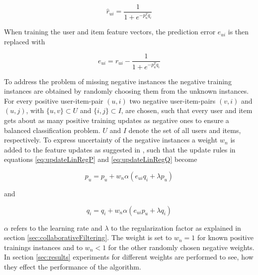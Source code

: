 \documentclass[10pt]{reportMaster}
\begin{document}
$$
	\hat{r}_{ui} = \frac{1}{1 + e^{-p_u^Tq_i}}
$$

When training the user and item feature vectors, the prediction error $e_{ui}$ is then replaced with 

$$
	e_{ui} = r_{ui} - \frac{1}{1 + e^{-p_u^Tq_i}}
$$


To address the problem of missing negative instances the negative training instances are obtained by randomly choosing them from the unknown instances.
For every positive user-item-pair $(u, i)$ two negative user-item-pairs $(v, i)$ and $(u,j)$, with $\{u, v\} \subset U$ and $\{i, j\} \subset I$, are chosen, such that every user and item gets about as many positive training updates as negative ones to ensure a balanced classification problem.
$U$ and $I$ denote the set of all users and items, respectively.
To express uncertainty of the negative instances a weight $w_n$ is added to the feature updates as suggested in \cite{occf}, such that the update rules in equations \ref{eq:updateLinRegP} and \ref{eq:updateLinRegQ} become 

\begin{equation}
\label{eq:updateLogRegP}
	p_u = p_u + w_n \alpha (e_{ui} q_i + \lambda p_u)
\end{equation}

and 

\begin{equation}
\label{eq:updateLogRegQ}
	q_i = q_i + w_n \alpha (e_{ui} p_u + \lambda q_i)
\end{equation}

$\alpha$ refers to the learning rate and $\lambda$ to the regularization factor as explained in section \ref{sec:collaborativeFiltering}.
The weight is set to $w_n = 1$ for known positive trainings instances and to $w_n < 1$ for the other randomly chosen negative weights.
In section \ref{sec:results} experiments for different weights are performed to see, how they effect the performance of the algorithm.
\end{document}
